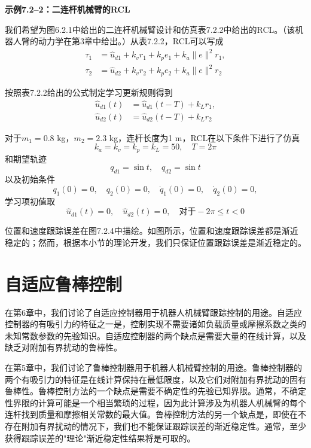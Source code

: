 \documentclass[UTF8]{ctexart}
\begin{document}
\textbf{示例7.2--2：二连杆机械臂的RCL}

我们希望为图6.2.1中给出的二连杆机械臂设计和仿真表7.2.2中给出的RCL。（该机器人臂的动力学在第3章中给出。）从表7.2.2，RCL可以写成
\begin{align}
\tau_1 &= \hat{u}_{d1} + k_v r_1 + k_p e_1 + k_a\|e\|^2r_1, \\
\tau_2 &= \hat{u}_{d2} + k_v r_2 + k_p e_2 + k_a\|e\|^2r_2
\end{align}

按照表7.2.2给出的公式制定学习更新规则得到
\begin{align}
\hat{u}_{d1}(t) &= \hat{u}_{d1}(t-T) + k_L r_1, \\
\hat{u}_{d2}(t) &= \hat{u}_{d2}(t-T) + k_L r_2
\end{align}

对于$m_1=0.8$ kg，$m_2=2.3$ kg，连杆长度为1 m，RCL在以下条件下进行了仿真
\begin{equation*}
k_a = k_v = k_p = k_L = 50, \quad T = 2\pi
\end{equation*}
和期望轨迹
\begin{equation*}
q_{d1} = \sin t, \quad q_{d2} = \sin t
\end{equation*}
以及初始条件
\begin{equation*}
q_1(0)=0,\quad q_2(0)=0,\quad \dot{q}_1(0)=0,\quad \dot{q}_2(0)=0,
\end{equation*}
学习项初值取
\begin{equation*}
\hat{u}_{d1}(t) = 0, \quad \hat{u}_{d2}(t) = 0, \quad \text{对于} -2\pi \leq t < 0
\end{equation*}

位置和速度跟踪误差在图7.2.4中描绘。如图所示，位置和速度跟踪误差都是渐近稳定的；然而，根据本小节的理论开发，我们只保证位置跟踪误差是渐近稳定的。

\section{自适应鲁棒控制}

在第6章中，我们讨论了自适应控制器用于机器人机械臂跟踪控制的用途。自适应控制器的有吸引力的特征之一是，控制实现不需要诸如负载质量或摩擦系数之类的未知常数参数的先验知识。自适应控制器的两个缺点是需要大量的在线计算，以及缺乏对附加有界扰动的鲁棒性。

在第5章中，我们讨论了鲁棒控制器用于机器人机械臂控制的用途。鲁棒控制器的两个有吸引力的特征是在线计算保持在最低限度，以及它们对附加有界扰动的固有鲁棒性。鲁棒控制方法的一个缺点是需要不确定性的先验已知界限。通常，不确定性界限的计算可能是一个相当繁琐的过程，因为此计算涉及为机器人机械臂的每个连杆找到质量和摩擦相关常数的最大值。鲁棒控制方法的另一个缺点是，即使在不存在附加有界扰动的情况下，我们也不能保证跟踪误差的渐近稳定性。通常，至少获得跟踪误差的"理论"渐近稳定性结果将是可取的。
\end{document}
